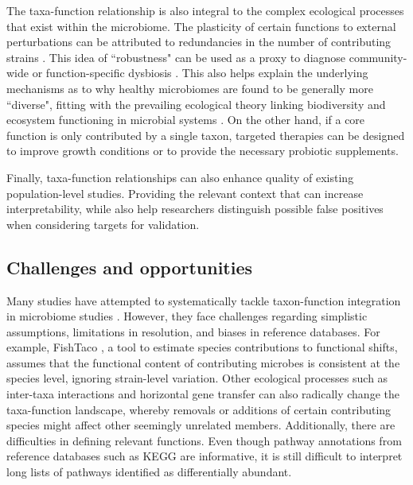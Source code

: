 The taxa-function relationship is also integral to the complex ecological processes that exist within the microbiome. The plasticity of certain functions to external perturbations can be attributed to redundancies in the number of contributing strains \cite{walker1992biodiversity, moya2016functional}. This idea of ``robustness" \cite{eng2018taxafunction} can be used as a proxy to diagnose community-wide or function-specific dysbiosis \cite{vieira-silva2016species}. This also helps explain the underlying mechanisms as to why healthy microbiomes are found to be generally more ``diverse", fitting with the prevailing ecological theory linking biodiversity and ecosystem functioning in microbial systems \cite{tilman2014biodiversity}. On the other hand, if a core function is only contributed by a single taxon, targeted therapies can be designed to improve growth conditions or to provide the necessary probiotic supplements.  

Finally, taxa-function relationships can also enhance quality of existing population-level studies. Providing the relevant context that can increase interpretability, while also help researchers distinguish possible false positives when considering targets for validation. 

\subsection{Challenges and opportunities}

Many studies have attempted to systematically tackle taxon-function integration in microbiome studies \cite{manor2017systematic, vieira-silva2016species, eng2018taxafunction, noecker2019defining}. However, they face challenges regarding simplistic assumptions, limitations in resolution, and biases in reference databases. For example, FishTaco \cite{manor2017systematic}, a tool to estimate species contributions to functional shifts, assumes that the functional content of contributing microbes is consistent at the species level, ignoring strain-level variation. Other ecological processes such as inter-taxa interactions and horizontal gene transfer can also radically change the taxa-function landscape, whereby removals or additions of certain contributing species might affect other seemingly unrelated members. Additionally, there are difficulties in defining relevant functions. Even though pathway annotations from reference databases such as KEGG are informative, it is still difficult to interpret long lists of pathways identified as differentially abundant. 

